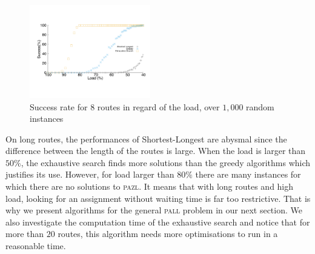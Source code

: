 \documentclass[10pt, conference, letterpaper]{IEEEtran}
\newcommand\pazl{\textsc{pazl}\xspace}
\newcommand\pall{\textsc{pall}\xspace}
\begin{document}
%      
\begin{figure}[h]

       \begin{center}
      \includegraphics[width=0.47\textwidth]{echec_longues.pdf}
      \end{center}
       
      \caption{Success rate for $8$ routes in regard of the load, over $1,000$ random instances}\label{fig:long}
     \end{figure}
     
     On long routes, the performances of Shortest-Longest are abysmal since the difference between the length of the routes is large.
       When the load is larger than $50\%$, the exhaustive search finds more solutions than the greedy algorithms which justifies its use. However, for load larger than $80\%$ there are many instances for which there are no solutions to \pazl.
        It means that with long routes and high load, looking for an assignment without waiting time is far too restrictive. That is why we present algorithms for the general \pall problem in our next section. 
          We also investigate the computation time of the exhaustive search and notice that for more than $20$ routes, this algorithm needs more optimisations to run in a reasonable time.
     
\end{document}
